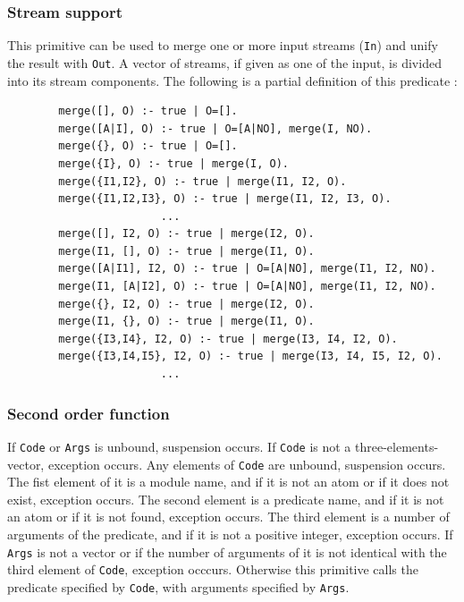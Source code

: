 \subsubsection{Stream support}
\begin{itemize}

This primitive can be used to merge one or more input streams (\verb|In|) and
unify the result with \verb|Out|. A vector
of streams, if given as one of the input, is divided into its stream
components.
The following is a partial definition of this predicate :
\begin{verbatim}
        merge([], O) :- true | O=[].
        merge([A|I], O) :- true | O=[A|NO], merge(I, NO).
        merge({}, O) :- true | O=[].
        merge({I}, O) :- true | merge(I, O).
        merge({I1,I2}, O) :- true | merge(I1, I2, O).
        merge({I1,I2,I3}, O) :- true | merge(I1, I2, I3, O).
                        ...
        merge([], I2, O) :- true | merge(I2, O).
        merge(I1, [], O) :- true | merge(I1, O).
        merge([A|I1], I2, O) :- true | O=[A|NO], merge(I1, I2, NO).
        merge(I1, [A|I2], O) :- true | O=[A|NO], merge(I1, I2, NO).
        merge({}, I2, O) :- true | merge(I2, O).
        merge(I1, {}, O) :- true | merge(I1, O).
        merge({I3,I4}, I2, O) :- true | merge(I3, I4, I2, O).
        merge({I3,I4,I5}, I2, O) :- true | merge(I3, I4, I5, I2, O).
                        ...
\end{verbatim}

\end{itemize}
\subsubsection{Second order function}
\begin{itemize}

If \verb|Code| or \verb|Args| is unbound, suspension occurs.
If \verb|Code| is not a three-elements-vector, exception occurs.
Any elements of \verb|Code| are unbound, suspension occurs.
The fist element of it is a module name, and if it is not an atom
or if it does not exist, exception occurs.
The second element is a predicate name, and if it is not an atom
or if it is not found, exception occurs.
The third element is a number of arguments of the predicate,
and if it is not a positive integer, exception occurs.
If \verb|Args| is not a vector or if the number of arguments of it is not
identical with the third element of \verb|Code|, exception occcurs.
Otherwise this primitive calls the predicate specified by \verb|Code|,
with arguments specified by \verb|Args|.

\end{itemize}
